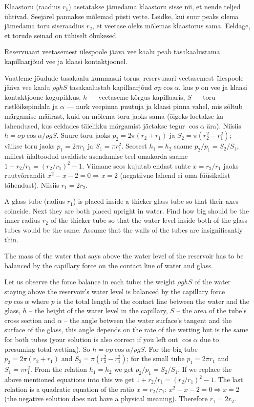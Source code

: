 
Klaastoru (raadius $r_1$) asetatakse jämedama klaastoru sisse nii, et nende teljed ühtivad. Seejärel
pannakse mõlemad püsti vette. Leidke, kui suur peaks olema jämedama toru
siseraadius $r_2$, et veetase oleks mõlemas klaastorus sama. Eeldage, et torude
seinad on tühiselt õhukesed.

\hint
Reservuaari veetasemest ülespoole jääva vee kaalu peab tasakaalustama kapillaarjõud vee ja klaasi kontaktjoonel.

\solu
Vaatleme jõudude tasakaalu kummaski torus: reservuaari veetasemest
ülespoole jääva vee kaalu $\rho g h S$ tasakaalustab kapillaarjõud
$\sigma p \cos\alpha$, kus $p$ on vee ja klaasi kontaktjoone kogupikkus,
$h$ --- veetaseme kõrgus kapillaaris, $S$ --- toru ristlõikepindala ja
$\alpha$ --- nurk veepinna puutuja ja klaasi pinna vahel, mis sõltub
märgamise määrast, kuid on mõlema toru jaoks sama (õigeks loetakse ka lahendused, 
kus eeldades täielikku märgamist jäetakse tegur $\cos\alpha$ ära). Niisiis $h=\sigma p
\cos\alpha/\rho g S$. Suure toru jaoks $p_2=2\pi (r_2+r_1)$ ja
$S_2=\pi(r_2^2-r_1^2)$; väikse toru jaoks $p_1=2\pi r_1$ ja $S_1=\pi
r_1^2$. Seosest $h_1=h_2$ saame $p_2/p_1=S_2/S_1$, millest ülaltoodud
avaldiste asendamise teel omakorda saame
$1+r_2/r_1=(r_2/r_1)^2-1$. Viimane seos kujutab endast suhte $x=r_2/r_1$
jaoks ruutvõrrandit $x^2-x-2=0 \Rightarrow x=2$ (negatiivne lahend ei
oma füüsikalist tähendust). Niisiis $r_1=2 r_2$.

A glass tube (radius $r_1$) is placed inside a thicker glass tube so that their axes coincide. Next they are both placed upright in water. Find how big should be the inner radius $r_2$ of the thicker tube so that the water level inside both of the glass tubes would be the same. Assume that the walls of the tubes are insignificantly thin.

\hinteng
The mass of the water that says above the water level of the reservoir has to be balanced by the capillary force on the contact line of water and glass.

\solueng
Let us observe the force balance in each tube: the weight $\rho g h S$ of the water staying above the reservoir’s water level is balanced by the capillary force $\sigma p \cos \alpha$ where $p$ is the total length of the contact line between the water and the glass, $h$ – the height of the water level in the capillary, $S$ – the area of the tube’s cross section and $\alpha$ – the angle between the water surface’s tangent and the surface of the glass, this angle depends on the rate of the wetting but is the same for both tubes (your solution is also correct if you left out $\cos\alpha$ due to presuming total wetting). So $h=\sigma p
\cos\alpha/\rho g S$. For the big tube $p_2=2\pi (r_2+r_1)$ and $S_2=\pi(r_2^2-r_1^2)$; for the small tube $p_1=2\pi r_1$ and $S_1=\pi
r_1^2$. From the relation $h_1=h_2$ we get $p_2/p_1=S_2/S_1$. If we replace the above mentioned equations into this we get $1+r_2/r_1=(r_2/r_1)^2-1$. The last relation is a quadratic equation of the ratio $x=r_2/r_1$: $x^2-x-2=0 \Rightarrow x=2$ (the negative solution does not have a physical meaning). Therefore $r_1=2 r_2$.
\probend